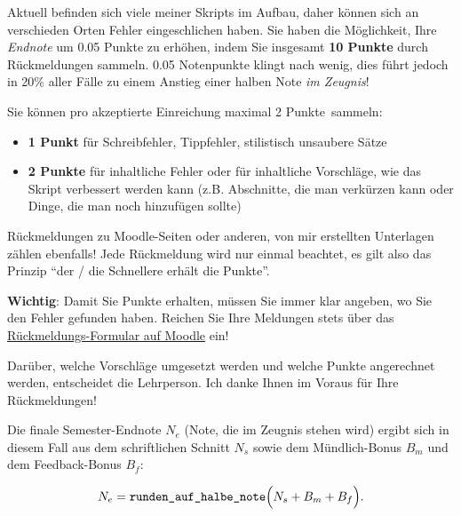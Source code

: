 \begin{textBox}[title=\emoji{speech-balloon} Bonus 2: Rückmeldungen zu den Skripts und Unterlagen]
Aktuell befinden sich viele meiner Skripts im Aufbau, daher können sich an verschieden Orten Fehler eingeschlichen haben. Sie haben die Möglichkeit, Ihre \textit{Endnote} um 0.05 Punkte zu erhöhen, indem Sie insgesamt \textbf{10 Punkte} durch Rückmeldungen sammeln. 0.05 Notenpunkte klingt nach wenig, dies führt jedoch in 20\% aller Fälle zu einem Anstieg einer halben Note \textit{im Zeugnis}!

Sie können pro akzeptierte Einreichung maximal 2 Punkte sammeln:
\begin{itemize}
\item \textbf{1 Punkt} für Schreibfehler, Tippfehler, stilistisch unsaubere Sätze
\item \textbf{2 Punkte} für inhaltliche Fehler oder für inhaltliche Vorschläge, wie das Skript verbessert werden kann (z.B. Abschnitte, die man verkürzen kann oder Dinge, die man noch hinzufügen sollte)
\end{itemize}

Rückmeldungen zu Moodle-Seiten oder anderen, von mir erstellten Unterlagen zählen ebenfalls! Jede Rückmeldung wird nur einmal beachtet, es gilt also das Prinzip ``der / die Schnellere erhält die Punkte''.


\textbf{Wichtig}: Damit Sie Punkte erhalten, müssen Sie immer klar angeben, wo Sie den Fehler gefunden haben. Reichen Sie Ihre Meldungen stets über das \href{}{Rückmeldungs-Formular auf Moodle} ein!

Darüber, welche Vorschläge umgesetzt werden und welche Punkte angerechnet werden, entscheidet die Lehrperson. Ich danke Ihnen im Voraus für Ihre Rückmeldungen!



\end{textBox}

Die finale Semester-Endnote $N_e$ (Note, die im Zeugnis stehen wird) ergibt sich in diesem Fall aus dem schriftlichen Schnitt $N_s$ sowie dem Mündlich-Bonus $B_m$ und dem Feedback-Bonus $B_f$:

\[N_e=\text{\texttt{runden\_auf\_halbe\_note}}\Big(N_s+B_m+B_f\Big).\]